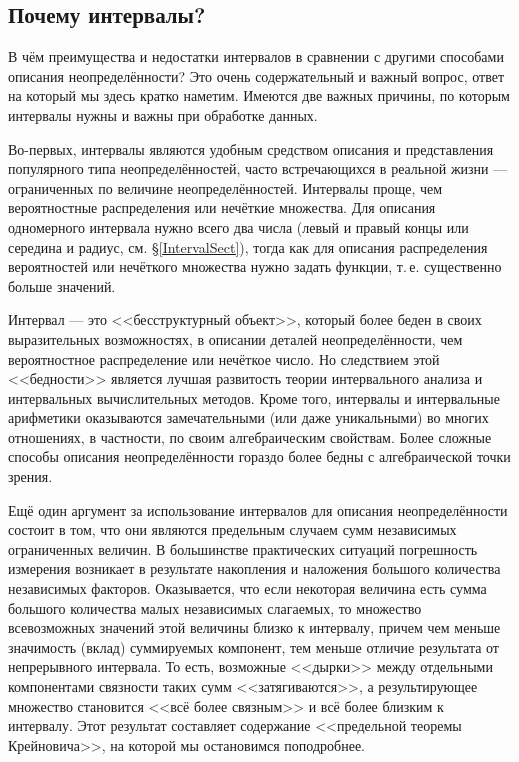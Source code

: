 \documentclass[a5paper,openany]{book}
\begin{document}
   
   
\subsection{Почему интервалы?}   
   
В чём преимущества и недостатки интервалов в сравнении с другими способами описания 
неопределённости? Это очень содержательный и важный вопрос, ответ на который мы здесь 
кратко наметим. Имеются две важных причины, по которым интервалы нужны и важны 
при обработке данных.  
  
Во-первых, интервалы являются удобным средством описания и представления популярного 
типа неопределённостей, часто встречающихся в реальной жизни --- ограниченных 
по величине неопределённостей. Интервалы проще, чем вероятностные распределения или 
нечёткие множества. Для описания одномерного интервала нужно всего два числа (левый 
и правый концы или середина и радиус, см. \S\ref{IntervalSect}), тогда как для описания 
распределения вероятностей или нечёткого множества нужно задать функции, т.\,е. 
существенно больше значений. 
  
Интервал --- это <<бесструктурный объект>>, который более беден в своих выразительных 
возможностях, в описании деталей неопределённости, чем вероятностное распределение или 
нечёткое число. Но следствием этой <<бедности>> является лучшая развитость теории 
интервального анализа и интервальных вычислительных методов. Кроме того, интервалы 
и интервальные арифметики оказываются замечательными (или даже уникальными) во многих 
отношениях, в частности, по своим алгебраическим свойствам. Более сложные способы 
описания неопределённости гораздо более бедны с алгебраической точки зрения. 
  
Ещё один аргумент за использование интервалов для описания неопределённости состоит 
в том, что они являются предельным случаем сумм независимых ограниченных величин. 
В большинстве практических ситуаций погрешность измерения возникает в результате 
накопления и наложения большого количества независимых факторов. Оказывается, что 
если некоторая величина есть сумма большого количества малых независимых слагаемых, 
то множество всевозможных значений этой величины близко к интервалу, причем чем меньше 
значимость (вклад) суммируемых компонент, тем меньше отличие результата от непрерывного 
интервала. То есть, возможные <<дырки>> между отдельными компонентами связности таких 
сумм <<затягиваются>>, а результирующее множество становится <<всё более связным>> 
и всё более близким к интервалу. Этот результат составляет содержание <<предельной 
теоремы Крейновича>>, на которой мы остановимся поподробнее. 
     
\end{document}
